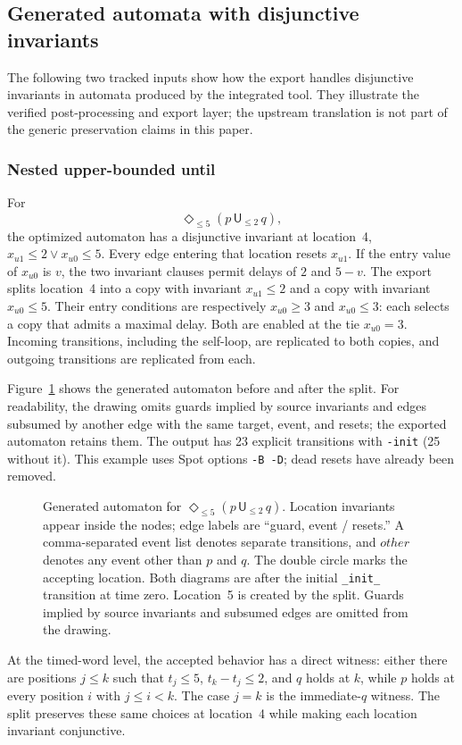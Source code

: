 \subsection{Generated automata with disjunctive invariants}
The following two tracked inputs show how the export handles disjunctive
invariants in automata produced by the integrated tool. They illustrate the
verified post-processing and export layer; the upstream translation is not
part of the generic preservation claims in this paper.

\subsubsection{Nested upper-bounded until}
For
\[
  \Diamond_{\le5}(p\,\mathsf U_{\le2}\,q),
\]
the optimized automaton has a disjunctive invariant at location~4,
$x_{u1}\le2\lor x_{u0}\le5$. Every edge entering that location resets
$x_{u1}$. If the entry value of $x_{u0}$ is $v$, the two invariant clauses
permit delays of $2$ and $5-v$. The export splits location~4 into a copy with
invariant $x_{u1}\le2$ and a copy with invariant $x_{u0}\le5$. Their entry
conditions are respectively $x_{u0}\ge3$ and $x_{u0}\le3$: each selects a
copy that admits a maximal delay. Both are enabled at the tie $x_{u0}=3$.
Incoming transitions, including the self-loop, are replicated to both
copies, and outgoing transitions are replicated from each.

Figure~\ref{fig:ex1-invariants} shows the generated automaton before and after
the split. For readability, the drawing omits guards implied by source
invariants and edges subsumed by another edge with the same target, event,
and resets; the exported automaton retains them. The output has 23 explicit
transitions with \texttt{-init} (25 without it). This example uses Spot
options \texttt{-B -D}; dead resets have already been removed.

\begin{figure}[!tp]
\centering
{}

\medskip

\caption{Generated automaton for $\Diamond_{\le5}(p\,\mathsf U_{\le2}\,q)$.
Location invariants appear inside the nodes; edge labels are ``guard, event /
resets.'' A comma-separated event list denotes separate transitions, and
$\mathit{other}$ denotes any event other than $p$ and $q$. The double circle
marks the accepting location. Both diagrams are after the initial
\texttt{\_init\_} transition at time zero. Location~5 is created by the
split. Guards implied by source invariants and subsumed edges are omitted from
the drawing.}
\label{fig:ex1-invariants}
\end{figure}
At the timed-word level, the accepted behavior has a direct witness: either
there are positions $j\le k$ such that $t_j\le5$, $t_k-t_j\le2$, and $q$
holds at $k$, while $p$ holds at every position $i$ with $j\le i<k$. The
case $j=k$ is the immediate-$q$ witness. The split preserves these same
choices at location~4 while making each location invariant conjunctive.

